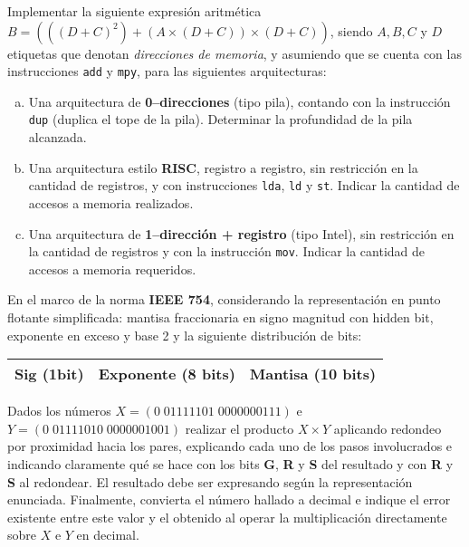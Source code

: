 \documentclass[12pt,a4paper]{article}
\begin{document}

Implementar la siguiente expresión aritmética $B = (((D + C)^2 )  + (A \times (D + C))\times (D + C))$, siendo $A, B, C$ y $D$ etiquetas que denotan \textit{direcciones de memoria}, y asumiendo que se cuenta con las instrucciones \texttt{add} y \texttt{mpy}, para las siguientes arquitecturas:
\begin{enumerate}[a)]
	\item Una arquitectura de \textbf{0--direcciones} (tipo pila), contando con la instrucción \texttt{dup} (duplica el tope de la pila). Determinar la profundidad de la pila alcanzada. 
	
	\item Una arquitectura estilo \textbf{RISC}, registro a registro, sin restricción en la cantidad de registros, y con instrucciones \texttt{lda}, \texttt{ld} y \texttt{st}. Indicar la cantidad de accesos a memoria realizados.
	
	\item Una arquitectura de \textbf{1--dirección + registro} (tipo Intel), sin restricción en la cantidad de registros y con la instrucción \texttt{mov}. Indicar la cantidad de accesos a memoria requeridos.	
\end{enumerate}

 En el marco de la norma \textbf{IEEE 754}, considerando la representación en punto flotante simplificada: mantisa fraccionaria en signo magnitud con hidden bit, exponente en exceso y base 2 y la siguiente distribución de bits:
\begin{center}
	\begin{tabular}{|c|c|c|}\hline
		Sig (1bit) & Exponente (8 bits) & Mantisa (10 bits)\\\hline
	\end{tabular}
\end{center}

Dados los números $X = (0\; 01111101\; 0000000111)$ e $Y = (0\; 01111010 \; 0000001001)$ realizar el producto $X \times Y$ aplicando redondeo por proximidad hacia los pares, explicando cada uno de los pasos involucrados e indicando claramente qué se hace con los bits \textbf{G}, \textbf{R} y \textbf{S} del resultado y con \textbf{R} y \textbf{S} al redondear. El resultado debe ser expresando según la representación enunciada. Finalmente, convierta el número hallado a decimal e indique el error existente entre este valor y el obtenido al operar la multiplicación directamente sobre $X$ e $Y$ en decimal.
\end{document}
